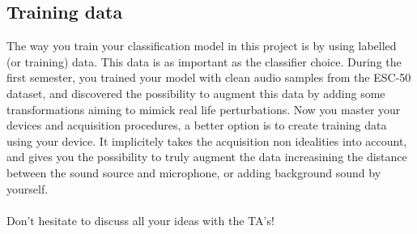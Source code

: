 \subsection{Training data}

The way you train your classification model in this project is by using labelled (or training) data. This data is as important as the classifier choice. During the first semester, you trained your model with clean audio samples from the ESC-50 dataset, and discovered the possibility to augment this data by adding some transformations aiming to mimick real life perturbations. Now you master your devices and acquisition procedures, a better option is to create training data using your device. It implicitely takes the acquisition non idealities into account, and gives you the possibility to truly augment the data increasining the distance between the sound source and microphone, or adding background sound by yourself. \\
\\
Don't hesitate to discuss all your ideas with the TA's!
